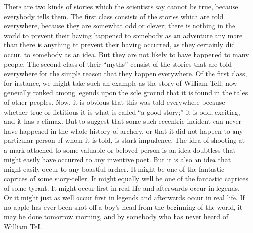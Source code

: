 There are two kinds of stories which the scientists say cannot be true, because everybody tells them. The first class consists of the stories which are told everywhere, because they are somewhat odd or clever; there is nothing in the world to prevent their having happened to somebody as an adventure any more than there is anything to prevent their having occurred, as they certainly did occur, to somebody as an idea. But they are not likely to have happened to many people. The second class of their “myths” consist of the stories that are told everywhere for the simple reason that they happen everywhere. Of the first class, for instance, we might take such an example as the story of William Tell, now generally ranked among legends upon the sole ground that it is found in the tales of other peoples. Now, it is obvious that this was told everywhere because whether true or fictitious it is what is called “a good story;” it is odd, exciting, and it has a climax. But to suggest that some such eccentric incident can never have happened in the whole history of archery, or that it did not happen to any particular person of whom it is told, is stark impudence. The idea of shooting at a mark attached to some valuable or beloved person is an idea doubtless that might easily have occurred to any inventive poet. But it is also an idea that might easily occur to any boastful archer. It might be one of the fantastic caprices of some story-teller. It might equally well be one of the fantastic caprices of some tyrant. It might occur first in real life and afterwards occur in legends. Or it might just as well occur first in legends and afterwards occur in real life. If no apple has ever been shot off a boy’s head from the beginning of the world, it may be done tomorrow morning, and by somebody who has never heard of William Tell.

